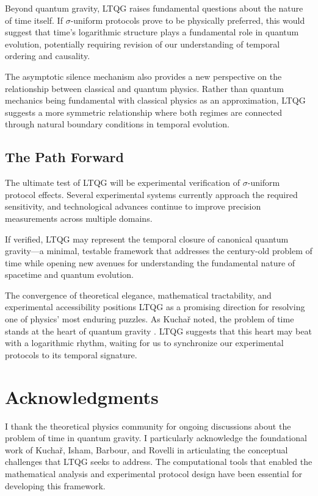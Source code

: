 \documentclass[12pt,a4paper]{article}
\begin{document}
Beyond quantum gravity, LTQG raises fundamental questions about the nature of time itself. If $\sigma$-uniform protocols prove to be physically preferred, this would suggest that time's logarithmic structure plays a fundamental role in quantum evolution, potentially requiring revision of our understanding of temporal ordering and causality.

The asymptotic silence mechanism also provides a new perspective on the relationship between classical and quantum physics. Rather than quantum mechanics being fundamental with classical physics as an approximation, LTQG suggests a more symmetric relationship where both regimes are connected through natural boundary conditions in temporal evolution.

\subsection{The Path Forward}

The ultimate test of LTQG will be experimental verification of $\sigma$-uniform protocol effects. Several experimental systems currently approach the required sensitivity, and technological advances continue to improve precision measurements across multiple domains.

If verified, LTQG may represent the temporal closure of canonical quantum gravity—a minimal, testable framework that addresses the century-old problem of time while opening new avenues for understanding the fundamental nature of spacetime and quantum evolution.

The convergence of theoretical elegance, mathematical tractability, and experimental accessibility positions LTQG as a promising direction for resolving one of physics' most enduring puzzles. As Kuchař noted, the problem of time stands at the heart of quantum gravity \cite{Kuchar1992}. LTQG suggests that this heart may beat with a logarithmic rhythm, waiting for us to synchronize our experimental protocols to its temporal signature.

\section*{Acknowledgments}

I thank the theoretical physics community for ongoing discussions about the problem of time in quantum gravity. I particularly acknowledge the foundational work of Kuchař, Isham, Barbour, and Rovelli in articulating the conceptual challenges that LTQG seeks to address. The computational tools that enabled the mathematical analysis and experimental protocol design have been essential for developing this framework.
\end{document}
